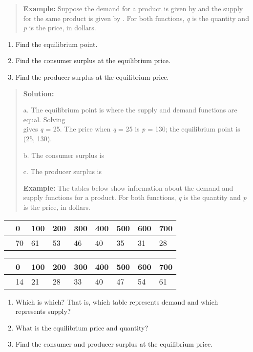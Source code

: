 \begin{quote}
\textbf{Example:} Suppose the demand for a product is given by and the
supply for the same product is given by . For both functions, \emph{q}
is the quantity and \emph{p} is the price, in dollars.
\end{quote}

\begin{enumerate}
\def\labelenumi{\alph{enumi}.}
\item
  Find the equilibrium point.
\item
  Find the consumer surplus at the equilibrium price.
\item
  Find the producer surplus at the equilibrium price.
\end{enumerate}

\begin{quote}
\textbf{Solution:}

a. The equilibrium point is where the supply and demand functions are
equal. Solving\\
gives \emph{q} = 25. The price when \emph{q} = 25 is \emph{p} = 130; the
equilibrium point is\\
(25, 130).

b. The consumer surplus is

c. The producer surplus is

\textbf{Example:} The tables below show information about the demand and
supply functions for a product. For both functions, \emph{q} is the
quantity and \emph{p} is the price, in dollars.
\end{quote}

\begin{longtable}[]{@{}lllllllll@{}}
\toprule
& 0 & 100 & 200 & 300 & 400 & 500 & 600 & 700\tabularnewline
\midrule
\endhead
& 70 & 61 & 53 & 46 & 40 & 35 & 31 & 28\tabularnewline
\bottomrule
\end{longtable}

\begin{longtable}[]{@{}lllllllll@{}}
\toprule
& 0 & 100 & 200 & 300 & 400 & 500 & 600 & 700\tabularnewline
\midrule
\endhead
& 14 & 21 & 28 & 33 & 40 & 47 & 54 & 61\tabularnewline
\bottomrule
\end{longtable}

\begin{enumerate}
\def\labelenumi{\alph{enumi}.}
\item
  Which is which? That is, which table represents demand and which
  represents supply?
\item
  What is the equilibrium price and quantity?
\item
  Find the consumer and producer surplus at the equilibrium price.
\end{enumerate}

